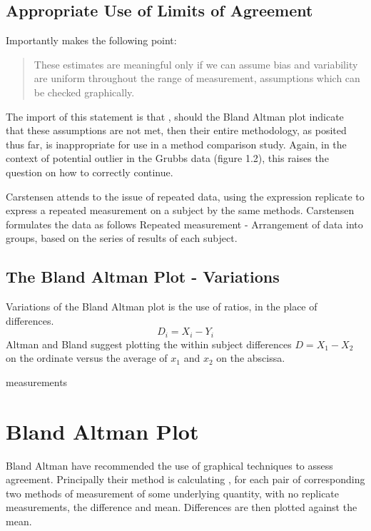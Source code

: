 \documentclass[12pt, a4paper]{report}
\begin{document}
	\subsection{Appropriate Use of Limits of Agreement}
	Importantly \citet{BA99} makes the following point:
	\begin{quote}These estimates are meaningful only if we can assume
		bias and variability are uniform throughout the range of
		measurement, assumptions which can be checked graphically.
	\end{quote}
	
	The import of this statement is that , should the Bland Altman
	plot indicate that these assumptions are not met, then their
	entire methodology, as posited thus far, is inappropriate for use
	in a method comparison study. Again, in the context of potential
	outlier in the Grubbs data (figure 1.2), this raises the question
	on how to correctly continue.
	
	Carstensen attends to the issue of repeated data, using the
	expression replicate to express a repeated measurement on a
	subject by the same methods. Carstensen formulates the data as
	follows Repeated measurement - Arrangement of data into groups,
	based on the series of results of each subject.
	
	\subsection{The Bland Altman Plot - Variations}
	Variations of the Bland Altman plot is the use of ratios, in the
	place of differences.
	\begin{equation}
	D_{i} = X_{i} - Y_{i}   \label{BA01}
	\end{equation}
	Altman and Bland suggest plotting the within subject differences $
	D = X_{1} - X_{2} $ on the ordinate versus the average of $x_{1}$
	and  $x_{2}$ on the abscissa.
	
	measurements\section{Bland Altman Plot} Bland Altman have
	recommended the use of graphical techniques to assess agreement.
	Principally their method is calculating , for each pair of
	corresponding two methods of measurement of some underlying
	quantity, with no replicate measurements, the difference and mean.
	Differences are then plotted against the mean.
	
\end{document}
